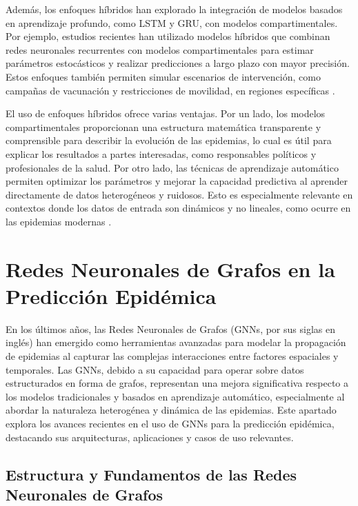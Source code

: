 Además, los enfoques híbridos han explorado la integración de modelos basados en aprendizaje profundo, como LSTM y GRU, con modelos compartimentales. Por ejemplo, estudios recientes han utilizado modelos híbridos que combinan redes neuronales recurrentes con modelos compartimentales para estimar parámetros estocásticos y realizar predicciones a largo plazo con mayor precisión. Estos enfoques también permiten simular escenarios de intervención, como campañas de vacunación y restricciones de movilidad, en regiones específicas \cite{Nguyen2023, Baccega2024}.

El uso de enfoques híbridos ofrece varias ventajas. Por un lado, los modelos compartimentales proporcionan una estructura matemática transparente y comprensible para describir la evolución de las epidemias, lo cual es útil para explicar los resultados a partes interesadas, como responsables políticos y profesionales de la salud. Por otro lado, las técnicas de aprendizaje automático permiten optimizar los parámetros y mejorar la capacidad predictiva al aprender directamente de datos heterogéneos y ruidosos. Esto es especialmente relevante en contextos donde los datos de entrada son dinámicos y no lineales, como ocurre en las epidemias modernas \cite{AutoSEIR2020, Baccega2024}.

\section{Redes Neuronales de Grafos en la Predicción Epidémica}\label{section:gnns-epidemic-forecasting}

En los últimos años, las Redes Neuronales de Grafos (GNNs, por sus siglas en inglés) han emergido como herramientas avanzadas para modelar la propagación de epidemias al capturar las complejas interacciones entre factores espaciales y temporales. Las GNNs, debido a su capacidad para operar sobre datos estructurados en forma de grafos, representan una mejora significativa respecto a los modelos tradicionales y basados en aprendizaje automático, especialmente al abordar la naturaleza heterogénea y dinámica de las epidemias. Este apartado explora los avances recientes en el uso de GNNs para la predicción epidémica, destacando sus arquitecturas, aplicaciones y casos de uso relevantes.

\subsection{Estructura y Fundamentos de las Redes Neuronales de Grafos}

